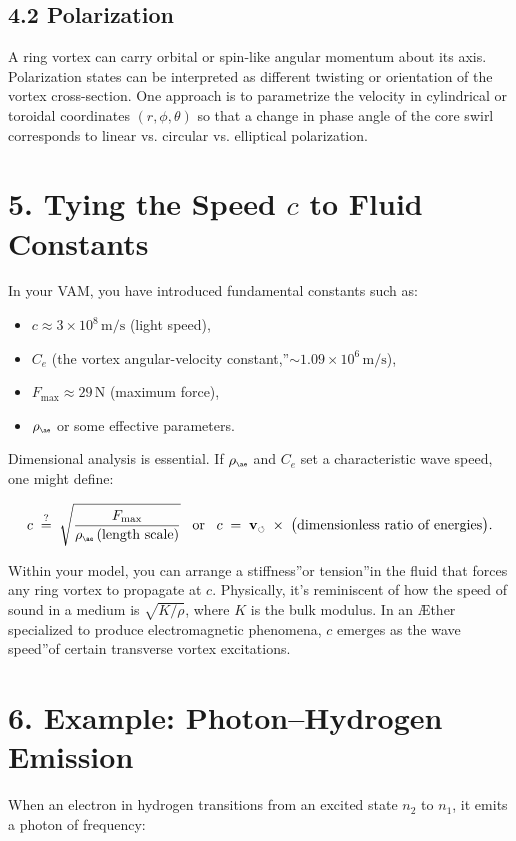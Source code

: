 \documentclass[a4paper,12pt]{article}
\begin{document}
\subsection*{4.2 Polarization}
A ring vortex can carry orbital or spin-like angular momentum about its axis. Polarization states can be interpreted as different twisting or orientation of the vortex cross-section. One approach is to parametrize the velocity in cylindrical or toroidal coordinates \((r,\phi,\theta)\) so that a change in phase angle of the core swirl corresponds to linear vs. circular vs. elliptical polarization.

\section*{5. Tying the Speed \(c\) to Fluid Constants}
In your VAM, you have introduced fundamental constants such as:

\begin{itemize}
 \item \(c \approx 3\times10^8\,\mathrm{m/s}\) (light speed),
 \item \(C_e\) (the \grqq vortex angular-velocity constant,\textquotedblright \(\sim 1.09\times10^6\,\mathrm{m/s}\)),
 \item \(F_{\max} \approx 29\,\mathrm{N}\) (maximum force),
 \item \(\rho_{\scriptscriptstyle\mathrm{\ae}}\) or some effective parameters.
\end{itemize}

Dimensional analysis is essential. If \(\rho_{\scriptscriptstyle \mathrm{\ae}}\) and \(C_e\) set a characteristic wave speed, one might define:

\[
 c \;\stackrel{?}{=}\; \sqrt{ \frac{F_{\max}}{\rho_{\scriptscriptstyle \mathrm{\ae}}\,(\text{length scale})} } \;\;\;\text{or}\;\;\; c \;=\; \mathbf{v}_{\scriptscriptstyle\boldsymbol{\circlearrowleft}} \;\times\; \bigl(\text{dimensionless ratio of energies}\bigr).
\]

Within your model, you can arrange a \grqq stiffness\textquotedblright or \grqq tension\textquotedblright in the fluid that forces any ring vortex to propagate at \(c\). Physically, it's reminiscent of how the speed of sound in a medium is \(\sqrt{K/\rho}\), where \(K\) is the bulk modulus. In an Æther specialized to produce electromagnetic phenomena, \(c\) emerges as the \grqq wave speed\textquotedblright of certain transverse vortex excitations.

\section*{6. Example: Photon–Hydrogen Emission}
When an electron in hydrogen transitions from an excited state \(n_2\) to \(n_1\), it emits a photon of frequency:
\end{document}
